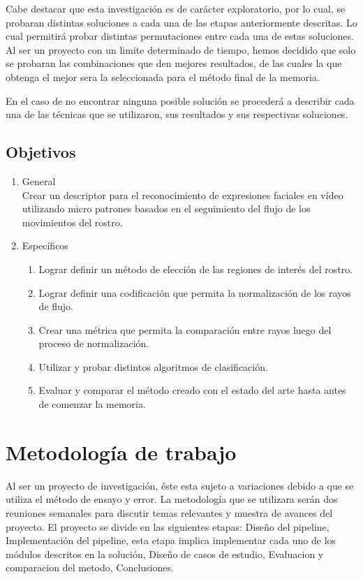 \documentclass{article}
\begin{document}
Cabe destacar que esta investigación es de carácter exploratorio, por lo cual, se probaran distintas soluciones a cada una de las etapas anteriormente descritas. Lo cual permitirá probar distintas permutaciones entre cada una de estas soluciones. Al ser un proyecto con un limite determinado de tiempo, hemos decidido que solo se probaran las combinaciones que den mejores resultados, de las cuales la que obtenga el mejor sera la seleccionada para el método final de la memoria. 

En el caso de no encontrar ninguna posible solución se procederá a describir cada una de las técnicas que se utilizaron, sus resultados y sus respectivas soluciones.  

\subsection{Objetivos} 
\begin{enumerate}
\item General\\

Crear un descriptor para el reconocimiento de expresiones faciales en vídeo utilizando micro patrones basados en el seguimiento del flujo de los movimientos del rostro.

\item Específicos
    \begin{enumerate}
    \item Lograr definir un método de elección de las regiones de interés del rostro.
    \item Lograr definir una codificación que permita la normalización de los rayos de flujo.
    \item Crear una métrica que permita la comparación entre rayos luego del proceso de normalización.
    \item Utilizar y probar distintos algoritmos de clasificación.
    \item Evaluar y comparar el método creado con el estado del arte hasta antes de comenzar la memoria.
    \end{enumerate}
\end{enumerate}

\section{Metodología de trabajo}
Al ser un proyecto de investigación, éste esta sujeto a variaciones debido a que se utiliza el método de ensayo y error. La metodología que se utilizara serán dos reuniones semanales para discutir temas relevantes y muestra de avances del proyecto.
	El proyecto se divide en las siguientes etapas: Diseño del pipeline, Implementación del pipeline, esta etapa implica implementar cada uno de los módulos descritos en la solución, Diseño de casos de estudio, Evaluacion y comparacion del metodo, Conclusiones.
\end{document}
